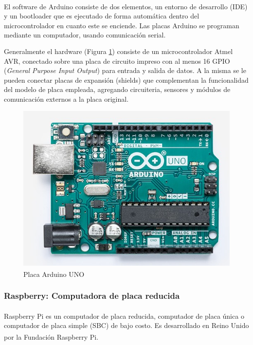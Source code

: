             \par El software de Arduino\textsuperscript{\textregistered} consiste de dos elementos, un entorno de desarrollo (IDE) y un bootloader que es ejecutado de forma automática dentro del microcontrolador en cuanto este se enciende. Las placas Arduino se programan mediante un computador, usando comunicación serial.
        
            \par Generalmente el hardware (Figura \ref{boardArduino}) consiste de un microcontrolador Atmel AVR, conectado sobre una placa de circuito impreso con al menos 16 GPIO (\textit{General Purpose Input Output}) para entrada y salida de datos. A la misma se le pueden conectar placas de expansión (shields) que complementan la funcionalidad del modelo de placa empleada, agregando circuiteria, sensores y módulos de comunicación externos a la placa original.
        
            \begin{figure}[h]
                \centering
                \includegraphics[scale=0.6]{hardware/Arduino.jpg}
                \caption{Placa Arduino\textsuperscript{\textregistered} UNO}
                \label{boardArduino}
            \end{figure}
        
        \subsubsection{Raspberry: Computadora de placa reducida}
            \par Raspberry\textsuperscript{\textregistered} Pi es un computador de placa reducida, computador de placa única o computador de placa simple (SBC) de bajo costo. Es desarrollado en Reino Unido por la Fundación Raspberry\textsuperscript{\textregistered} Pi.
        
